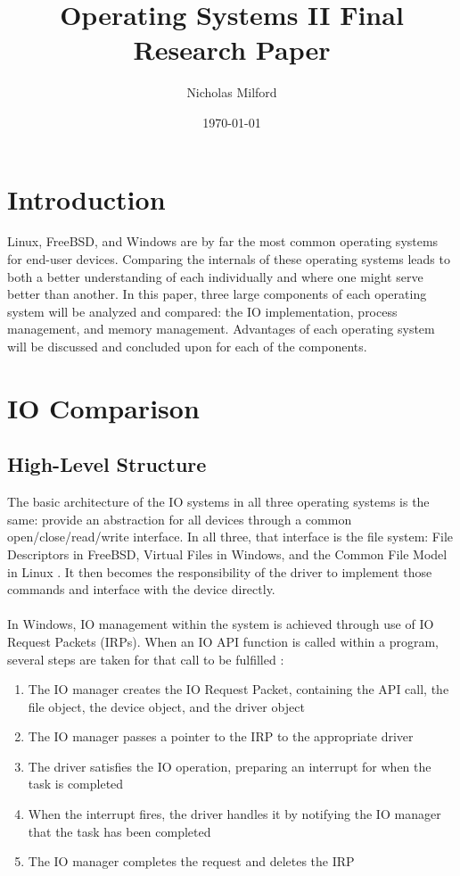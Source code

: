 \documentclass[10pt,draftclsnofoot,onecolumn]{article}
\title{Operating Systems II Final Research Paper}
\author{Nicholas Milford}
\date{\today}
\begin{document}
\maketitle

\thispagestyle{empty}

\section{Introduction}

Linux, FreeBSD, and Windows are by far the most common operating systems for end-user devices. Comparing the internals of these operating systems leads to both a better understanding of each individually and where one might serve better than another. In this paper, three large components of each operating system will be analyzed and compared: the IO implementation, process management, and memory management. Advantages of each operating system will be discussed and concluded upon for each of the components.

\section{IO Comparison}

\subsection{High-Level Structure}

The basic architecture of the IO systems in all three operating systems is the same: provide an abstraction for all devices through a common open/close/read/write interface. In all three, that interface is the file system: File Descriptors in FreeBSD, Virtual Files in Windows, and the Common File Model in Linux \cite{Loonix,BSDM,Wandos}. It then becomes the responsibility of the driver to implement those commands and interface with the device directly. 
\\\\
In Windows, IO management within the system is achieved through use of IO Request Packets (IRPs). When an IO API function is called within a program, several steps are taken for that call to be fulfilled \cite{Wandos}:\\

\begin{enumerate}
	\item The IO manager creates the IO Request Packet, containing the API call, the file object, the device object, and the driver object
	\item The IO manager passes a pointer to the IRP to the appropriate driver
	\item The driver satisfies the IO operation, preparing an interrupt for when the task is completed
	\item When the interrupt fires, the driver handles it by notifying the IO manager that the task has been completed
	\item The IO manager completes the request and deletes the IRP
\end{enumerate}
\end{document}
